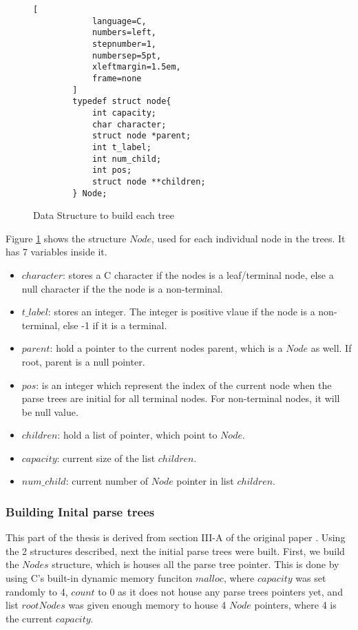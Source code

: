 \begin{figure}[H]

    \begin{tcolorbox}[title=Node Structure to build each tree, colback=white, colframe=black]

        \begin{lstlisting}[
            language=C,
            numbers=left,
            stepnumber=1,
            numbersep=5pt,
            xleftmargin=1.5em,
            frame=none
        ]
        typedef struct node{
            int capacity;
            char character;
            struct node *parent;
            int t_label;
            int num_child;
            int pos;
            struct node **children;
        } Node;
        \end{lstlisting}
    \end{tcolorbox}

\caption{Data Structure to build each tree}
\label{fig:Data_Structures2}
\end{figure}


Figure \ref{fig:Data_Structures2} shows the structure $Node$, used for each individual node in the trees. It has 7 variables inside it. 
\begin{itemize}
    \item $character$: stores a C character if the nodes is a leaf/terminal node, else a null character if the the node is a non-terminal.
    \item  $t\_label$: stores an integer. The integer is positive vlaue if the node is a non-terminal, else -1 if it is a terminal.
    \item $parent$: hold a pointer to the current nodes parent, which is a $Node$ as well. If root, parent is a null pointer.
    \item $pos$: is an integer which represent the index of the current node when the parse trees are initial for all terminal nodes. For non-terminal nodes, it will be null value.
    \item $children$: hold a list of pointer, which point to $Node$.
    \item $capacity$: current size of the list $children$. 
    \item $num\_child$: current number of $Node$ pointer in list $children$.
\end{itemize}

\subsubsection{Building Inital parse trees}
This part of the thesis is derived from section III-A of the original paper \cite{kulkarniLearningHighlyRecursive2021}. Using the 2 structures described, next the initial parse trees were built. First, we build the $Nodes$ structure, which is houses all the parse tree pointer. 
This is done by using C's built-in dynamic memory funciton $malloc$, where $capacity$ was set randomly to 4, $count$ to 0 as it does not house any parse trees pointers yet, and list $rootNodes$ was given enough memory to house 4 $Node$ pointers, where 4 is the current $capacity$. 

